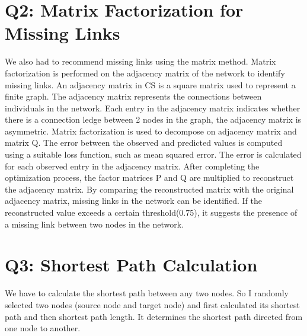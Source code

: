 \documentclass{article}
\begin{document}
\section*{Q2: Matrix Factorization for Missing Links}

We also had to recommend missing links using the matrix method. Matrix factorization is performed on the adjacency matrix of the network 
to identify missing links. An adjacency matrix in CS is a square matrix used to represent a finite graph. The adjacency matrix represents 
the connections between individuals in the network. Each entry in the adjacency matrix indicates whether there is a connection ledge 
between 2 nodes in the graph, the adjacency matrix is asymmetric. Matrix factorization is used to decompose on adjacency matrix and 
matrix Q. The error between the observed and predicted values is computed using a suitable loss function, such as mean squared error. The
 error is calculated for each observed entry in the adjacency matrix. After completing the optimization process, the factor matrices P 
 and Q are multiplied to reconstruct the adjacency matrix. By comparing the reconstructed matrix with the original adjacency matrix, 
 missing links in the network can be identified. If the reconstructed value exceeds a certain threshold(0.75), it suggests the presence 
 of a missing link between two nodes in the network.

\section*{Q3: Shortest Path Calculation}

We have to calculate the shortest path between any two nodes. So I randomly selected two nodes (source node and target node) and first 
calculated its shortest path and then shortest path length. It determines the shortest path directed from one node to another.
\end{document}
